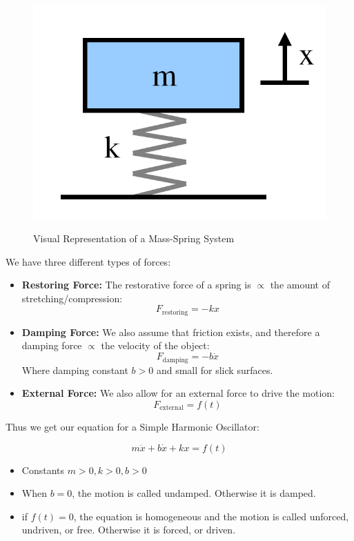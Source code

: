 \documentclass[12pt, landscape, twocolumn]{article}
\begin{document}
        \begin{figure}[h!]
            \centering
            \includegraphics[scale=0.25]{./img/mass_spring.png}
            \label{fig:massspringsystem}
            \caption{Visual Representation of a Mass-Spring System}
        \end{figure}

        We have three different types of forces:

            \begin{itemize}
                \item \textbf{Restoring Force:} The restorative force of a spring is $\propto$ the amount of stretching/compression:
                    \[ F_{\text{restoring} } = -k x \]
                \item \textbf{Damping Force:} We also assume that friction exists, and therefore a damping force $\propto$ the velocity of the object:
                    \[ F_{\text{damping} } = -b \dot{x} \]
                    Where damping constant $b > 0$ and small for slick surfaces.
                \item \textbf{External Force:} We also allow for an external force to drive the motion:
                    \[ F_{\text{external} } = f(t) \]
            \end{itemize}

        Thus we get our equation for a Simple Harmonic Oscillator:

            \[ m \ddot{x} + b \dot{x} + kx = f(t) \]

            \begin{itemize}
                \item Constants $m>0, k>0, b>0$
                \item When $b=0$, the motion is called undamped. Otherwise it is damped.
                \item if $f(t)=0$, the equation is homogeneous and the motion is called unforced, undriven, or free. Otherwise it is forced, or driven.
            \end{itemize}
\end{document}
